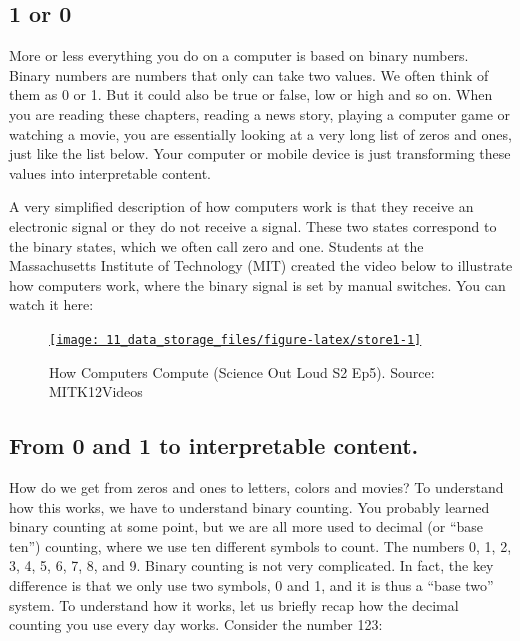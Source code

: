 \documentclass[
]{book}
\begin{document}
\hypertarget{or-0}{%
\subsection*{1 or 0}\label{or-0}}

More or less everything you do on a computer is based on binary numbers. Binary numbers are numbers that only can take two values. We often think of them as 0 or 1. But it could also be true or false, low or high and so on. When you are reading these chapters, reading a news story, playing a computer game or watching a movie, you are essentially looking at a very long list of zeros and ones, just like the list below. Your computer or mobile device is just transforming these values into interpretable content.

A very simplified description of how computers work is that they receive an electronic signal or they do not receive a signal. These two states correspond to the binary states, which we often call zero and one. Students at the Massachusetts Institute of Technology (MIT) created the video below to illustrate how computers work, where the binary signal is set by manual switches. You can watch it here:

\begin{figure}

{\centering \href{https://www.youtube.com/embed/8cVsgFN3hSM}{\texttt{[image: 11\_data\_storage\_files/figure-latex/store1-1]} }

}

\caption{How Computers Compute (Science Out Loud S2 Ep5). Source: MITK12Videos}\label{fig:store1}
\end{figure}

\hypertarget{from-0-and-1-to-interpretable-content.}{%
\subsection*{From 0 and 1 to interpretable content.}\label{from-0-and-1-to-interpretable-content.}}

How do we get from zeros and ones to letters, colors and movies? To understand how this works, we have to understand binary counting. You probably learned binary counting at some point, but we are all more used to decimal (or ``base ten'') counting, where we use ten different symbols to count. The numbers 0, 1, 2, 3, 4, 5, 6, 7, 8, and 9. Binary counting is not very complicated. In fact, the key difference is that we only use two symbols, 0 and 1, and it is thus a ``base two'' system. To understand how it works, let us briefly recap how the decimal counting you use every day works.
Consider the number 123:
\end{document}
